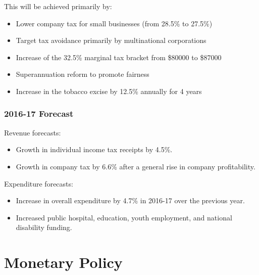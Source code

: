\documentclass[a4paper,11pt]{report}
\begin{document}
This will be achieved primarily by:

\begin{itemize}
\item Lower company tax for small businesses (from 28.5\% to 27.5\%)
\item Target tax avoidance primarily by multinational corporations
\item Increase of the 32.5\% marginal tax bracket from \$80000 to \$87000
\item Superannuation reform to promote fairness
\item Increase in the tobacco excise by 12.5\% annually for 4 years
\end{itemize}

\subsection{2016-17 Forecast}

Revenue forecasts:

\begin{itemize}
\item Growth in individual income tax receipts by 4.5\%.
\item Growth in company tax by 6.6\% after a general rise in company
	profitability.
\end{itemize}

Expenditure forecasts:

\begin{itemize}
\item Increase in overall expenditure by 4.7\% in 2016-17 over the previous
	year.
\item Increased public hospital, education, youth employment, and national
	disability funding.
\end{itemize}




\chapter{Monetary Policy}
\end{document}
